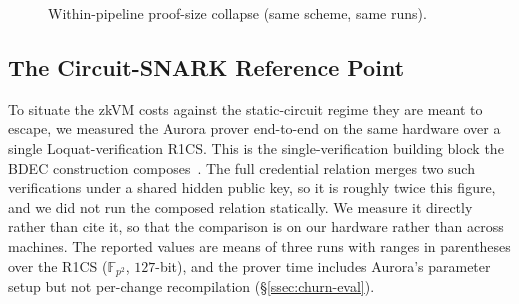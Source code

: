 \begin{figure}[H]
\centering
{}
\caption{Within-pipeline proof-size collapse (same scheme, same runs).}
\label{fig:proof-collapse}
\end{figure}

\subsection{The Circuit-SNARK Reference Point}\label{ssec:aurora-ref}
To situate the zkVM costs against the static-circuit regime they are meant to escape, we measured the Aurora prover end-to-end on the same hardware over a single Loquat-verification R1CS. This is the single-verification building block the BDEC construction composes~\cite{10.1007/978-981-96-0957-4_3}. The full credential relation merges two such verifications under a shared hidden public key, so it is roughly twice this figure, and we did not run the composed relation statically. We measure it directly rather than cite it, so that the comparison is on our hardware rather than across machines. The reported values are means of three runs with ranges in parentheses over the R1CS ($\mathbb{F}_{p^2}$, $127$-bit), and the prover time includes Aurora's parameter setup but not per-change recompilation (\S\ref{ssec:churn-eval}).

